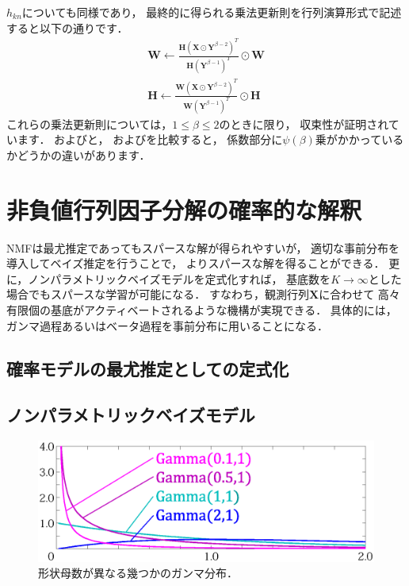 $h_{kn}$についても同様であり，
最終的に得られる乗法更新則を行列演算形式で記述すると以下の通りです．
\begin{align}
\bm{W} \gets 
\frac{\bm{H} \left(\bm{X} \odot \bm{Y}^{\beta - 2}\right)^T}
                  {\bm{H} \left(\bm{Y}^{\beta - 1}\right)^T}
 \odot \bm{W}
\label{eqn:beta_nmf_mu_W_2}
\\
\bm{H} \gets 
\frac{\bm{W} \left(\bm{X} \odot \bm{Y}^{\beta - 2}\right)^T}
                  {\bm{W} \left(\bm{Y}^{\beta - 1}\right)^T}
 \odot \bm{H}
\label{eqn:beta_nmf_mu_H_2}
\end{align}
これらの乗法更新則については，$1 \le \beta \le 2$のときに限り，
収束性が証明されています．
およびと，
およびを比較すると，
係数部分に$\psi(\beta)$乗がかかっているかどうかの違いがあります．

\section{非負値行列因子分解の確率的な解釈}

NMFは最尤推定であってもスパースな解が得られやすいが，
適切な事前分布を導入してベイズ推定を行うことで，
よりスパースな解を得ることができる．
更に，ノンパラメトリックベイズモデルを定式化すれば，
基底数を$K \rightarrow \infty$とした場合でもスパースな学習が可能になる．
すなわち，観測行列$\bm{X}$に合わせて
高々有限個の基底がアクティベートされるような機構が実現できる．
具体的には，ガンマ過程あるいはベータ過程を事前分布に用いることになる．

\subsection{確率モデルの最尤推定としての定式化}

\subsection{ノンパラメトリックベイズモデル}

\begin{figure}[t]
\centering
\includegraphics[width=.9\linewidth]{sections/factorization/gamma}
\caption{形状母数が異なる幾つかのガンマ分布．}
\label{fig:gamma}
\end{figure}

